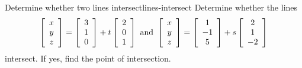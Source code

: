 \documentclass{ximera}
\begin{document}
\begin{example}{Determine whether two lines intersect}{lines-intersect}
  Determine whether the lines
  \begin{equation*}
    \startmat{c} x \\ y \\ z \stopmat
    = \startmat{c} 3 \\ 1 \\ 0 \stopmat
    + t \startmat{c} 2 \\ 0 \\ 1 \stopmat
    \quad\mbox{and}\quad
    \startmat{c} x \\ y \\ z \stopmat
    = \startmat{c} 1 \\ -1 \\ 5 \stopmat
    + s \startmat{c} 2 \\ 1 \\ -2 \stopmat
  \end{equation*}
  intersect. If yes, find the point of intersection.%
\end{example}
\end{document}
